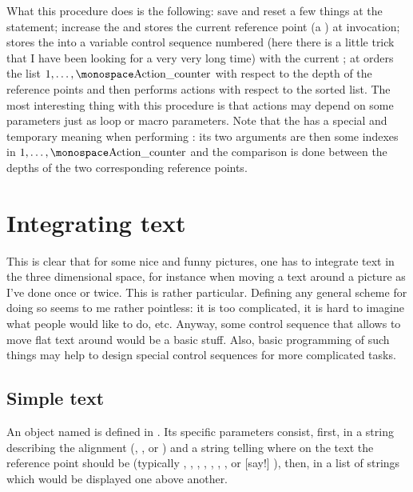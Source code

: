 \noindent
What this procedure does is the following: save and reset a few things
at the  statement; increase the  and
stores the current reference point (a ) at 
invocation; stores the  into a
variable control sequence numbered (here there is a little trick that
I have been looking for a very very long time) with the current
; at  orders the list
$1,\dots,\cs{Action\_counter}$ with respect to the depth of the
reference points and then performs actions with respect to the sorted
list. The most interesting thing with this procedure is that actions
may depend on some parameters just as loop or macro parameters.  Note
that the  has a special and temporary meaning when
performing : its two arguments are then some indexes in
$1,\dots,\cs{Action\_counter}$ and the comparison is done between the
depths of the two corresponding reference points.

\section{Integrating text}

This is clear that for some nice and funny pictures, one has to
integrate text in the three dimensional space, for instance when
moving a text around a picture as I've done once or twice. This is
rather particular. Defining any general scheme for doing so seems to
me rather pointless: it is too complicated, it is hard to imagine what
people would like to do, etc.  Anyway, some control sequence that
allows to move flat text around would be a basic stuff. Also, basic
programming of such things may help to design special control
sequences for more complicated tasks.

\subsection{Simple text}
An object named  is defined in .  Its
specific parameters consist, first, in a string describing the
alignment (, ,  or )
and a string telling where on the text the reference point should be
(typically , , , ,
, , ,  or [say!]
), then, in a list of strings which would be displayed
one above another.

